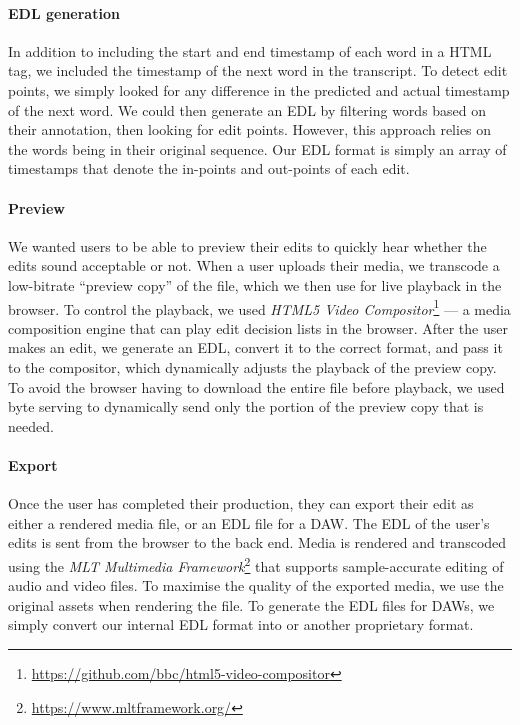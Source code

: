 \paragraph{EDL generation}
In addition to including the start and end timestamp of each word in a HTML tag, we included the timestamp of the next
word in the transcript. To detect edit points, we simply looked for any difference in the predicted and actual timestamp
of the next word.  We could then generate an EDL by filtering words based on their annotation, then looking for edit points.
However, this approach relies on the words being in their original sequence.  Our EDL format is simply an array of
timestamps that denote the in-points and out-points of each edit.

\paragraph{Preview}
We wanted users to be able to preview their edits to quickly hear whether the edits sound acceptable or not.  When a
user uploads their media, we transcode a low-bitrate ``preview copy'' of the file, which we then use for live playback
in the browser.  To control the playback, we used \textit{HTML5 Video
Compositor}\footnote{\url{https://github.com/bbc/html5-video-compositor}} --- a media composition engine that can play
edit decision lists in the browser.  After the user makes an edit, we generate an EDL, convert it to the correct
format, and pass it to the compositor, which dynamically adjusts the playback of the preview copy.  To avoid the browser
having to download the entire file before playback, we used byte serving to dynamically send only the portion of the
preview copy that is needed.

\paragraph{Export}
Once the user has completed their production, they can export their edit as either a rendered media file, or an EDL
file for a DAW. The EDL of the user's edits is sent from the browser to the back end. Media is
rendered and transcoded using the \textit{MLT Multimedia Framework}\footnote{\url{https://www.mltframework.org/}} that
supports sample-accurate editing of audio and video files. To maximise the quality of the exported media, we use the original assets
when rendering the file. To generate the EDL files for DAWs, we simply convert our internal EDL format into
\citet{AES2008} or another proprietary format.

